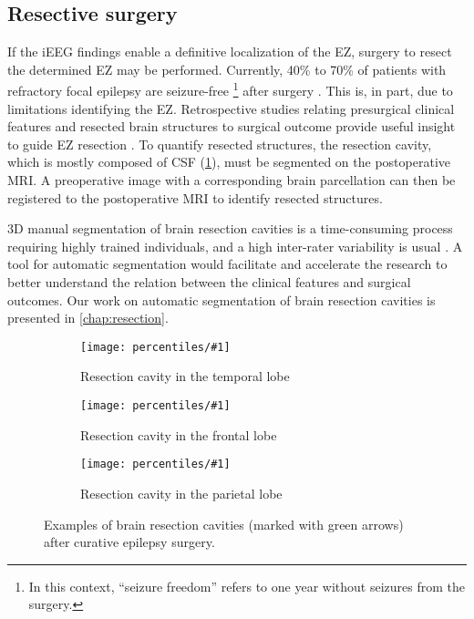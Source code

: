 \subsection{Resective surgery}

If the \ac{iEEG} findings enable a definitive localization of the \ac{EZ}, surgery to resect the determined \ac{EZ} may be performed.
Currently, 40\% to 70\% of patients with refractory focal epilepsy are seizure-free%
\footnote{In this context, ``seizure freedom'' refers to one year without seizures from the surgery.}
after surgery \cite{jobst_resective_2015}.
This is, in part, due to limitations identifying the \ac{EZ}.
Retrospective studies relating presurgical clinical features and resected brain structures to surgical outcome provide useful insight to guide \ac{EZ} resection \cite{jobst_resective_2015}.
To quantify resected structures, the resection cavity, which is mostly composed of \ac{CSF} (\cref{fig:cavities}), must be segmented on the postoperative \ac{MRI}.
A preoperative image with a corresponding brain parcellation can then be registered to the postoperative \ac{MRI} to identify resected structures.

3D manual segmentation of brain resection cavities is a time-consuming process requiring highly trained individuals, and a high inter-rater variability is usual \cite{havaei_brain_2017}.
A tool for automatic segmentation would facilitate and accelerate the research to better understand the relation between the clinical features and surgical outcomes.
Our work on automatic segmentation of brain resection cavities is presented in \cref{chap:resection}.


\newcommand{\plotcavities}[2]{
  \begin{subfigure}{0.8\linewidth}
    \texttt{[image: percentiles/\#1]}
    \caption{#2}
  \end{subfigure}
}

\begin{figure}
  \centering

  \plotcavities{p_050_0185_arrows}{Resection cavity in the temporal lobe}
  \plotcavities{p_075_1263_arrows}{Resection cavity in the frontal lobe}
  \plotcavities{p_025_0039_arrows}{Resection cavity in the parietal lobe}

  \caption[Examples of brain resection cavities after curative epilepsy surgery.]{
    Examples of brain resection cavities (marked with green arrows) after curative epilepsy surgery.
  }
  \label{fig:cavities}
\end{figure}
